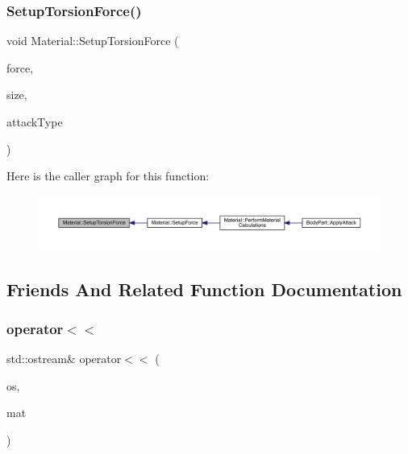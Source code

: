 \subsubsection{\texorpdfstring{Setup\+Torsion\+Force()}{SetupTorsionForce()}}
{\footnotesize\ttfamily void Material\+::\+Setup\+Torsion\+Force (\begin{DoxyParamCaption}\item[{float}]{force,  }\item[{float}]{size,  }\item[{\mbox{\hyperlink{_enum_types_8hpp_a904b2f9c8f3951116c343784c59d6afe}{Attack\+Type}}}]{attack\+Type }\end{DoxyParamCaption})\hspace{0.3cm}{\ttfamily [private]}}

Here is the caller graph for this function\+:
\nopagebreak
\begin{figure}[H]
\begin{center}
\leavevmode
\includegraphics[width=350pt]{class_material_a767010a40d459c05e14afc641217a21b_icgraph}
\end{center}
\end{figure}


\subsection{Friends And Related Function Documentation}
\mbox{\label{class_material_a5bfba11792fa55afcf4fec622c4a4f4b}} 
\subsubsection{\texorpdfstring{operator$<$$<$}{operator<<}}
{\footnotesize\ttfamily std\+::ostream\& operator$<$$<$ (\begin{DoxyParamCaption}\item[{std\+::ostream \&}]{os,  }\item[{const \mbox{\hyperlink{class_material}{Material}} \&}]{mat }\end{DoxyParamCaption})\hspace{0.3cm}{\ttfamily [friend]}}



